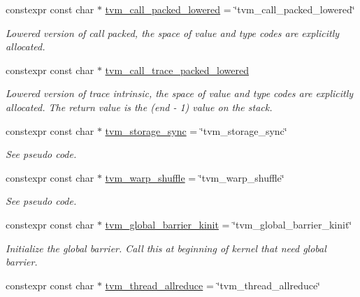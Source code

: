 \begin{DoxyCompactItemize}
constexpr const char $\ast$ \hyperlink{namespacetvm_1_1tir_1_1intrinsic_ad1044b04b108f8d72d8468c7df8a426f}{tvm\+\_\+call\+\_\+packed\+\_\+lowered} = \char`\"{}tvm\+\_\+call\+\_\+packed\+\_\+lowered\char`\"{}
\begin{DoxyCompactList}\small\item\em Lowered version of call packed, the space of value and type codes are explicitly allocated. \end{DoxyCompactList}\item 
constexpr const char $\ast$ \hyperlink{namespacetvm_1_1tir_1_1intrinsic_ad906c61d3e4610e103d5fee028e6147f}{tvm\+\_\+call\+\_\+trace\+\_\+packed\+\_\+lowered}
\begin{DoxyCompactList}\small\item\em Lowered version of trace intrinsic, the space of value and type codes are explicitly allocated. The return value is the (end -\/ 1) value on the stack. \end{DoxyCompactList}\item 
constexpr const char $\ast$ \hyperlink{namespacetvm_1_1tir_1_1intrinsic_a327df78182d6687b72a93c468a3cd962}{tvm\+\_\+storage\+\_\+sync} = \char`\"{}tvm\+\_\+storage\+\_\+sync\char`\"{}
\begin{DoxyCompactList}\small\item\em See pseudo code. \end{DoxyCompactList}\item 
constexpr const char $\ast$ \hyperlink{namespacetvm_1_1tir_1_1intrinsic_a1c5047acaa6e7e500840f9a1984f4e58}{tvm\+\_\+warp\+\_\+shuffle} = \char`\"{}tvm\+\_\+warp\+\_\+shuffle\char`\"{}
\begin{DoxyCompactList}\small\item\em See pseudo code. \end{DoxyCompactList}\item 
constexpr const char $\ast$ \hyperlink{namespacetvm_1_1tir_1_1intrinsic_a7ccada41188e0161827169ce24a6db16}{tvm\+\_\+global\+\_\+barrier\+\_\+kinit} = \char`\"{}tvm\+\_\+global\+\_\+barrier\+\_\+kinit\char`\"{}
\begin{DoxyCompactList}\small\item\em Initialize the global barrier. Call this at beginning of kernel that need global barrier. \end{DoxyCompactList}\item 
constexpr const char $\ast$ \hyperlink{namespacetvm_1_1tir_1_1intrinsic_a374a98c3ef9da28a660825a0457ae997}{tvm\+\_\+thread\+\_\+allreduce} = \char`\"{}tvm\+\_\+thread\+\_\+allreduce\char`\"{}

\end{DoxyCompactItemize}
